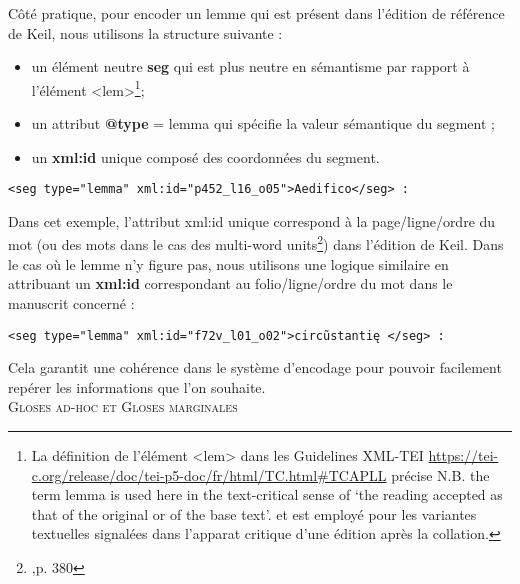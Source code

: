 \documentclass[a4paper, twoside, 12pt]{book}
\begin{document}
Côté pratique, pour encoder un lemme qui est présent dans l'édition de référence de Keil, nous utilisons la structure suivante :

\begin{itemize}
    \item un élément neutre \textbf{seg} qui est plus neutre en sémantisme par rapport à l'élément <lem>\footnote{La définition de l'élément <lem> dans les Guidelines XML-TEI \url{https://tei-c.org/release/doc/tei-p5-doc/fr/html/TC.html\#TCAPLL} précise \og{}N.B. the term lemma is used here in the text-critical sense of ‘the reading accepted as that of the original or of the base text’.\fg{} et est employé pour les variantes textuelles signalées dans l'apparat critique d'une édition après la collation.};
    \item un attribut \textbf{@type} = lemma qui spécifie la valeur sémantique du segment ;
    \item un \textbf{xml:id} unique composé des coordonnées du segment.\\
\end{itemize}

\begin{verbatim}
<seg type="lemma" xml:id="p452_l16_o05">Aedifico</seg> :
\end{verbatim}

Dans cet exemple, l'attribut xml:id unique correspond à la page/ligne/ordre du mot (ou des mots dans le cas des \og{} multi-word units\fg{}\footnote{\cite{oSullivan2017lemma},p. 380}) dans l'édition de Keil. Dans le cas où le lemme n'y figure pas, nous utilisons une logique similaire en attribuant un \textbf{xml:id} correspondant au folio/ligne/ordre du mot dans le manuscrit concerné : \\

\begin{verbatim} 
<seg type="lemma" xml:id="f72v_l01_o02">circũstantię </seg> :
\end{verbatim}

Cela garantit une cohérence dans le système d'encodage pour pouvoir facilement repérer les informations que l'on souhaite.\\

\textsc{Gloses ad-hoc et Gloses marginales}\\
\end{document}
